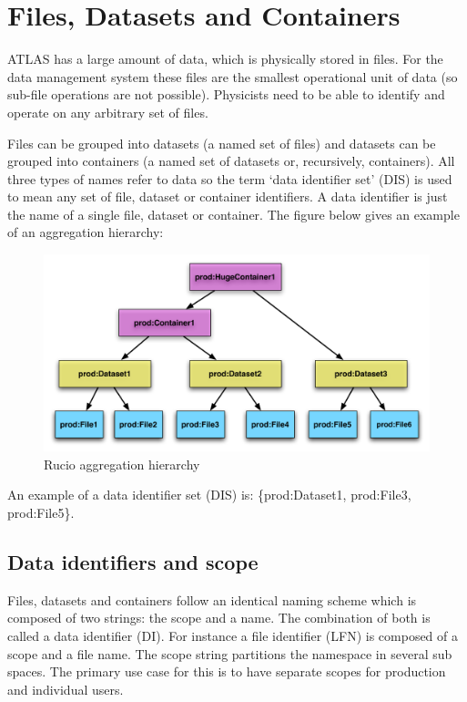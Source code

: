 \documentclass{atlasnote}
\begin{document}
\section{Files, Datasets and Containers}
\label{overview_Dataset:dataset}

ATLAS has a large amount of data, which is physically stored in files. For the data management system these files are the smallest operational unit of data (so sub-file operations are not possible). Physicists need to be able to identify and operate on any arbitrary set of files.

Files can be grouped into datasets (a named set of files) and datasets can be grouped into containers (a named set of datasets or, recursively, containers). All three types of names refer to data so the term ‘data identifier set’ (DIS) is used to mean any set of file, dataset or container identifiers. A data identifier is just the name of a single file, dataset or container. The figure below gives an example of an aggregation hierarchy:

\begin{figure}[ht]
\begin{center}
\includegraphics[width=400pt]{aggregation_hierarchy}
\end{center}
\caption{\label{hierarchy} Rucio aggregation hierarchy}
\end{figure}

\noindent An example of a data identifier set (DIS) is: \{prod:Dataset1, prod:File3, prod:File5\}.

\subsection{Data identifiers and scope}
\label{overview_Dataset:data-identifiers-and-scope}

Files, datasets and containers follow an identical naming scheme which is composed of two strings: the scope and a name. The combination of both is called a data identifier (DI). For instance a file identifier (LFN) is composed of a scope and a file name. The scope string partitions the namespace in several sub spaces. The primary use case for this is to have separate scopes for production and individual users.
\end{document}
